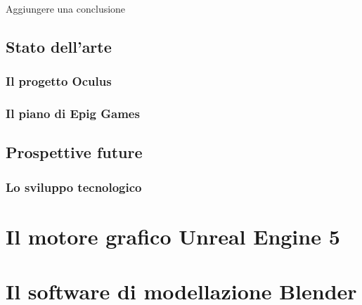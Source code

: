         Aggiungere una conclusione

    \subsection{Stato dell'arte}

        \subsubsection{Il progetto Oculus}

        \subsubsection{Il piano di Epig Games}

    \subsection{Prospettive future}

        \subsubsection{Lo sviluppo tecnologico}

\section{Il motore grafico Unreal Engine 5}

\section{Il software di modellazione Blender}











